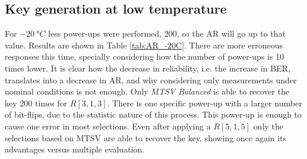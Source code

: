 \begin{table}[H]
  \caption{BER and AR value for the different selections when performing 2000 power-ups under nominal conditions using two different repetition codes.}
  \label{tab:AR_nominal}%
\end{table}%

\subsection{Key generation at low temperature}

 For $\SI{-20}{\degree C}$ less power-ups were performed, 200, so the AR will go up to that value. Results are shown in Table \ref{tab:AR_-20C}. There are more erroneous responses this time, specially considering how the number of power-ups is 10 times lower. It is clear how the decrease in reliability, i.e. the increase in BER, translates into a decrease in AR, and why considering only measurements under nominal conditions is not enough. Only \textit{MTSV Balanced} is able to recover the key 200 times for $R[3,1,3]$. There is one specific power-up with a larger number of bit-flips, due to the statistic nature of this process. This power-up is enough to cause one error in most selections. Even after applying a $R[5,1,5]$ only the selections based on MTSV are able to recover the key, showing once again its advantages versus multiple evaluation. 


